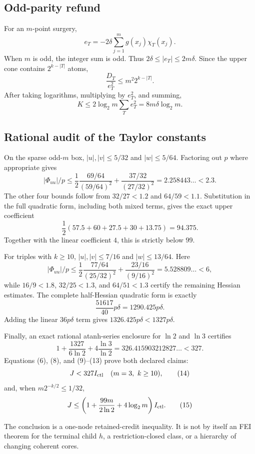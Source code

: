 \subsection*{Odd-parity refund}

For an $m$-point surgery,
\[
 e_T=-2\delta\sum_{j=1}^m g(x_j)\chi_T(x_j).             \tag{7}
\]
When $m$ is odd, the integer sum is odd.  Thus
$2\delta\le|e_T|\le2m\delta$.  Since the upper cone contains
$2^{k-|T|}$ atoms,
\[
 \frac{D_T}{e_T^2}\le m^2 2^{k-|T|}.
\]
After taking logarithms, multiplying by $e_T^2$, and summing,
\[
 K\le 2\log_2m\sum_Te_T^2=8m\delta\log_2m.              \tag{8}
\]

\subsection*{Rational audit of the Taylor constants}

On the sparse odd-$m$ box, $|u|,|v|\le5/32$ and
$|w|\le5/64$.  Factoring out $p$ where appropriate gives
\[
 |\Phi_{uu}|/p\le
 \frac12\frac{69/64}{(59/64)^2}
 +\frac{37/32}{(27/32)^2}
 =2.258443\ldots<2.3.                                   \tag{9}
\]
The other four bounds follow from
$32/27<1.2$ and $64/59<1.1$.  Substitution in the full
quadratic form, including both mixed terms, gives the exact upper
coefficient
\[
 \frac12\left(57.5+60+27.5+30+13.75\right)=94.375.      \tag{10}
\]
Together with the linear coefficient $4$, this is strictly below $99$.

For triples with $k\ge10$, $|u|,|v|\le7/16$ and
$|w|\le13/64$.  Here
\[
 |\Phi_{uu}|/p\le
 \frac12\frac{77/64}{(25/32)^2}
 +\frac{23/16}{(9/16)^2}
 =5.528809\ldots<6,                                    \tag{11}
\]
while $16/9<1.8$, $32/25<1.3$, and $64/51<1.3$ certify
the remaining Hessian estimates.  The complete half-Hessian quadratic
form is exactly
\[
 \frac{51617}{40}p\delta=1290.425p\delta.                \tag{12}
\]
Adding the linear $36p\delta$ term gives
$1326.425p\delta<1327p\delta$.

Finally, an exact rational atanh-series enclosure for $\ln2$ and $\ln3$
certifies
\[
 1+\frac{1327}{6\ln2}+4\frac{\ln3}{\ln2}
 =326.415903212827\ldots<327.                            \tag{13}
\]
Equations (6), (8), and (9)--(13) prove both declared claims:
\[
 J<327I_{\rm ctl}\quad(m=3,\ k\ge10),                   \tag{14}
\]
and, when $m2^{-k/2}\le1/32$,
\[
 J\le\left(1+\frac{99m}{2\ln2}+4\log_2m\right)
 I_{\rm ctl}.                                           \tag{15}
\]

The conclusion is a one-node retained-credit inequality.  It is not by
itself an FEI theorem for the terminal child $h$, a restriction-closed
class, or a hierarchy of changing coherent cores.
